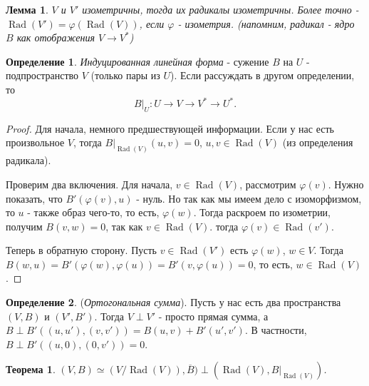 \documentclass[a4paper,100pt]{article}
\theoremstyle{indented}
\newtheorem{theorem}{Теорема}
\newtheorem{lemma}{Лемма}
\theoremstyle{definition}
\newtheorem{defn}{Определение}
\theoremstyle{remark}
\DeclareMathOperator{\Rad}{Rad}
\begin{document}
\begin{lemma}
    $V$ и $V'$ изометричны, тогда их радикалы изометричны. Более точно - $\Rad (V')=\varphi(\Rad (V))$, если $\varphi$ - изометрия. (напомним, радикал - ядро $B$ как отображения $V \rightarrow V^*$)
\end{lemma}

\begin{defn}
    \textit{Индуцированная линейная форма} - сужение $B$ на $U$ - подпространство $V$ (только пары из $U$). Если рассуждать в другом определении, то
    \[
        B\bigg|_U:U\rightarrow V\rightarrow V^* \rightarrow U^*.
    \]
\end{defn}

\begin{proof}
    Для начала, немного предшествующей информации. Если у нас есть произвольное $V$, тогда $B\bigg|_{\Rad(V)}(u, v)=0$, $u, v\in\Rad(V)$ (из определения радикала). \ 
    
    Проверим два включения. Для начала, $v\in \Rad (V)$, рассмотрим $\varphi(v)$. Нужно показать, что $B'(\varphi(v), u)$ - нуль. Но так как мы имеем дело с изоморфизмом, то $u$ - также образ чего-то, то есть, $\varphi(w)$. Тогда раскроем по изометрии, получим $B(v, w)=0$, так как $v\in \Rad(V)$. тогда $\varphi(v)\in \Rad(v')$. \ 

    Теперь в обратную сторону. Пусть $v \in \Rad(V')$ есть $\varphi(w)$, $w\in V$. Тогда $B(w, u)=B'(\varphi(w), \varphi(u))=B'(v, \varphi(u))=0$, то есть, $w\in \Rad(V)$.  
\end{proof}

\begin{defn}
    (\textit{Ортогональная сумма}). Пусть у нас есть два пространства $(V, B)$ и $(V', B')$. Тогда $V\perp V'$ - просто прямая сумма, а $B\perp B'((u, u'), (v, v'))=B(u, v)+B'(u' ,v')$. В частности, $B\perp B'((u, 0), (0, v'))=0$. 
\end{defn}

\begin{theorem}
    $(V, B)\simeq (V/\Rad(V)), \overline{B})\perp (\Rad(V), B\bigg|_{\Rad(V)})$. 
\end{theorem}
\end{document}
